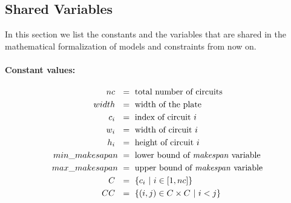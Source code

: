 
\subsection{Shared Variables} \label{sec:shared_variables}
    In this section we list the constants and the variables that are shared in the mathematical formalization of 
    models and constraints from now on.

    \paragraph{Constant values:}
    \begin{align*}
        nc\             &\ =\ \text{total number of circuits}                   \\
        width\          &\ =\ \text{width of the plate}                         \\
        c_i\            &\ =\ \text{index of circuit  } i                       \\
        w_i\            &\ =\ \text{width of circuit  } i                       \\
        h_i\            &\ =\ \text{height of circuit  } i                      \\
        min\_makesapan  &\ =\ \text{lower bound of \textit{makespan} variable}  \\
        max\_makesapan  &\ =\ \text{upper bound of \textit{makespan} variable}  \\
        C\              &\ =\ \{ c_i\ |\ i \in [1, nc]\}                         \\        
        CC\             &\ =\ \{(i, j) \in C \times C\ |\ i<j \}
    \end{align*}

